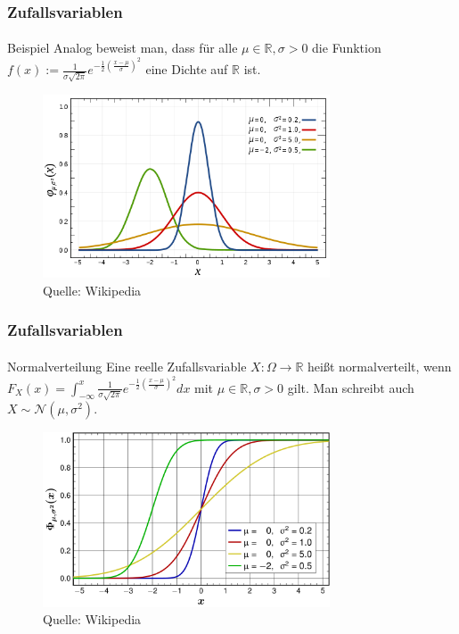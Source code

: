 \documentclass{beamer}
\begin{document}
\begin{frame}
    \frametitle{Zufallsvariablen}
\framesubtitle{}
\begin{block}{Beispiel}
Analog beweist man, dass für alle  $\mu \in \mathbb{R}, \sigma > 0 $ die Funktion $ f(x):=  \frac 1{\sigma \sqrt{2\pi}}e^{- \frac {1}{2} (\frac{x- \mu}{ \sigma})^2}$  eine  Dichte auf $ \mathbb{R}$ ist.
\end{block}
\begin{figure}[htp]
      \centering
    \includegraphics[width=0.76\textwidth]{img/normal}
      \caption{Quelle: Wikipedia}
\end{figure}
 \end{frame}

\begin{frame}
    \frametitle{Zufallsvariablen}
\framesubtitle{}
\begin{block}{Normalverteilung}
Eine reelle Zufallsvariable $X: \Omega \to \mathbb{R}$ heißt normalverteilt, wenn 
$F_X (x) = \int_{- \infty}^{x}  \frac 1{\sigma \sqrt{2\pi}}e^{- \frac {1}{2} (\frac{x- \mu}{ \sigma})^2}dx$ mit  $\mu \in \mathbb{R}, \sigma > 0 $ gilt. Man schreibt auch $X \sim \mathcal{N}(\mu, \sigma^2)$.
\end{block}
\begin{figure}[htp]
      \centering
    \includegraphics[width=0.76\textwidth]{img/normaldist}
      \caption{Quelle: Wikipedia}
\end{figure}
 \end{frame}
\end{document}
